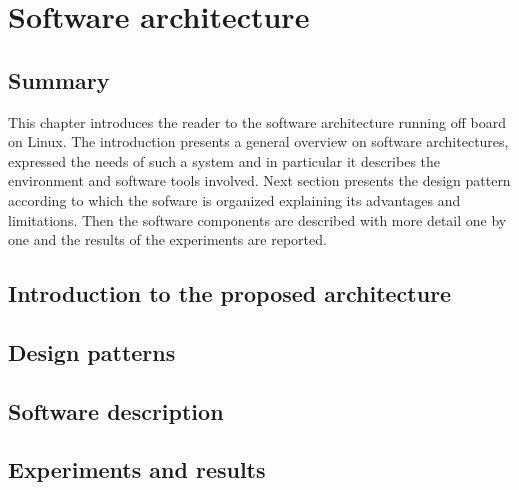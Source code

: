 
\chapter{Software architecture}
\label{chap:sixth
}
\ifpdf
    \graphicspath{{Chapter6/Figures/PNG/}{Chapter6/Figures/PDF/}{Chapter6/Figures/}}
\else
    \graphicspath{{Chapter6/Figures/EPS/}{Chapter6/Figures/}}
\fi

\section*{Summary}

This chapter introduces the reader to the software architecture running off board on Linux. The introduction presents a  general overview on software architectures, expressed the needs of such a system and in particular it describes the environment and software tools involved. Next section presents the design pattern according to which the sofware is organized explaining its advantages and limitations. Then the software components are described with more detail one by one and the results of the experiments are reported.
\section{Introduction to the proposed architecture}




\section{Design patterns}
\label{sec:patterns}

\section{Software description}


\section{Experiments and results}